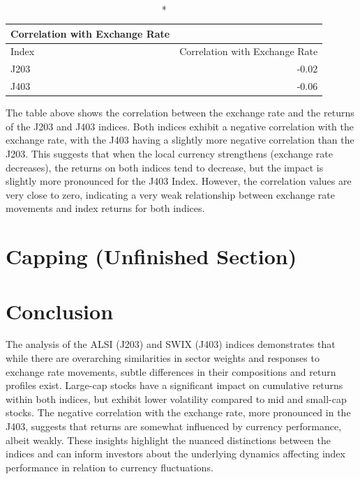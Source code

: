 \documentclass[11pt,preprint, authoryear]{elsarticle}
\numberwithin{equation}{section}
\numberwithin{figure}{section}
\numberwithin{table}{section}
\begin{document}
\begin{longtable}{lr}
\caption*{
{\large Correlation with Exchange Rate}
} \\ 
\toprule
Index & Correlation with Exchange Rate \\ 
\midrule
J203 & -0.02 \\ 
J403 & -0.06 \\ 
\bottomrule
\end{longtable}

The table above shows the correlation between the exchange rate and the
returns of the J203 and J403 indices. Both indices exhibit a negative
correlation with the exchange rate, with the J403 having a slightly more
negative correlation than the J203. This suggests that when the local
currency strengthens (exchange rate decreases), the returns on both
indices tend to decrease, but the impact is slightly more pronounced for
the J403 Index. However, the correlation values are very close to zero,
indicating a very weak relationship between exchange rate movements and
index returns for both indices.

\hypertarget{capping-unfinished-section}{%
\section{Capping (Unfinished
Section)}\label{capping-unfinished-section}}

\hypertarget{conclusion}{%
\section{Conclusion}\label{conclusion}}

The analysis of the ALSI (J203) and SWIX (J403) indices demonstrates
that while there are overarching similarities in sector weights and
responses to exchange rate movements, subtle differences in their
compositions and return profiles exist. Large-cap stocks have a
significant impact on cumulative returns within both indices, but
exhibit lower volatility compared to mid and small-cap stocks. The
negative correlation with the exchange rate, more pronounced in the
J403, suggests that returns are somewhat influenced by currency
performance, albeit weakly. These insights highlight the nuanced
distinctions between the indices and can inform investors about the
underlying dynamics affecting index performance in relation to currency
fluctuations.


\end{document}
